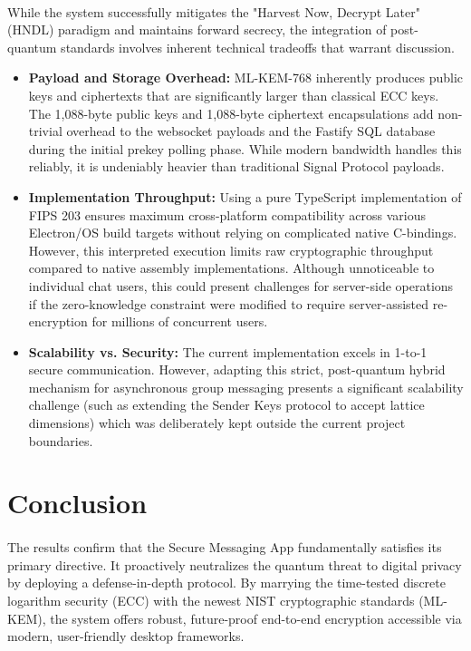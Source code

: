 \paragraph{}
While the system successfully mitigates the "Harvest Now, Decrypt Later" (HNDL) paradigm and maintains forward secrecy, the integration of post-quantum standards involves inherent technical tradeoffs that warrant discussion.

\begin{itemize}
    \item \textbf{Payload and Storage Overhead:} ML-KEM-768 inherently produces public keys and ciphertexts that are significantly larger than classical ECC keys. The 1,088-byte public keys and 1,088-byte ciphertext encapsulations add non-trivial overhead to the websocket payloads and the Fastify SQL database during the initial prekey polling phase. While modern bandwidth handles this reliably, it is undeniably heavier than traditional Signal Protocol payloads.
    \item \textbf{Implementation Throughput:} Using a pure TypeScript implementation of FIPS 203 ensures maximum cross-platform compatibility across various Electron/OS build targets without relying on complicated native C-bindings. However, this interpreted execution limits raw cryptographic throughput compared to native assembly implementations. Although unnoticeable to individual chat users, this could present challenges for server-side operations if the zero-knowledge constraint were modified to require server-assisted re-encryption for millions of concurrent users.
    \item \textbf{Scalability vs. Security:} The current implementation excels in 1-to-1 secure communication. However, adapting this strict, post-quantum hybrid mechanism for asynchronous group messaging presents a significant scalability challenge (such as extending the Sender Keys protocol to accept lattice dimensions) which was deliberately kept outside the current project boundaries.
\end{itemize}

\section{Conclusion}
\paragraph{}
The results confirm that the Secure Messaging App fundamentally satisfies its primary directive. It proactively neutralizes the quantum threat to digital privacy by deploying a defense-in-depth protocol. By marrying the time-tested discrete logarithm security (ECC) with the newest NIST cryptographic standards (ML-KEM), the system offers robust, future-proof end-to-end encryption accessible via modern, user-friendly desktop frameworks.
